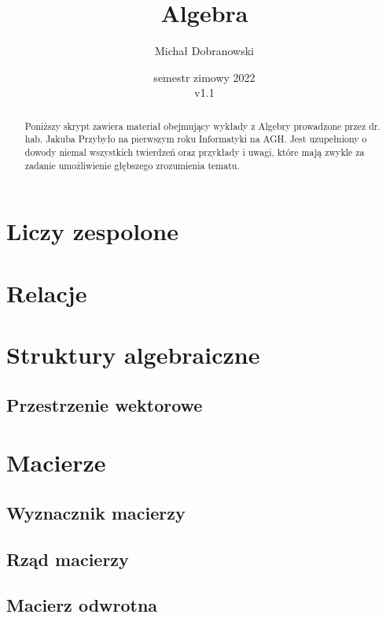 \documentclass[11pt]{scrartcl}
\title{Algebra}
\author{Michał Dobranowski}
\date{semestr zimowy 2022 \\ v1.1}
\begin{document}
    \maketitle
    \begin{abstract}
        \noindent Poniższy skrypt zawiera materiał obejmujący wykłady z Algebry prowadzone przez dr. hab. Jakuba Przybyło na pierwszym roku Informatyki na AGH. Jest uzupełniony o dowody niemal wszystkich twierdzeń oraz przykłady i uwagi, które mają zwykle za zadanie umożliwienie głębszego zrozumienia tematu.
    \end{abstract}
    \tableofcontents
    \newpage

    \section{Liczy zespolone}
    

    \section{Relacje}
    

    \section{Struktury algebraiczne}
    

        \subsection{Przestrzenie wektorowe}
        

    \section{Macierze}
    

        \subsection{Wyznacznik macierzy}
        

        \subsection{Rząd macierzy}
        

        \subsection{Macierz odwrotna}
        
\end{document}
